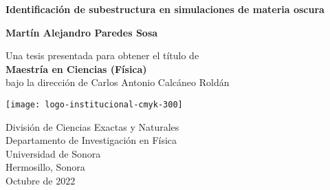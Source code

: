 
\setlength{\headheight}{15.25pt}

\setcounter{page}{1}


\newcommand{\thesistitle}{Identificación de
subestructura en simulaciones de materia oscura}
\newcommand{\minombre}{Martín Alejandro Paredes Sosa}
\newcommand{\supername}{Carlos Antonio Calcáneo Roldán}
\newcommand{\mespresentado}{Octubre de 2022}
\newpage

\thispagestyle{empty}
\begin{center}
  \vspace*{0.5cm}
  {\Huge \bf \thesistitle}

  \vspace*{2cm}
  {\LARGE\bf \minombre}

  \vfill

  {\Large Una tesis presentada para obtener el título de\\
    \vspace{.3cm}
    {\bf Maestría en Ciencias (Física)}\\
    \vspace{.6cm}
    bajo la dirección de \supername}
  \vspace*{0.9cm}

   \begin{center}
   \texttt{[image: logo-institucional-cmyk-300]}
   \end{center}

  {\large División de Ciencias Exactas y Naturales\\
          [-3mm] Departamento de Investigación en Física\\
          [-3mm] Universidad de Sonora\\
          [-3mm] Hermosillo, Sonora\\
          [1mm]  \mespresentado}

\end{center}

